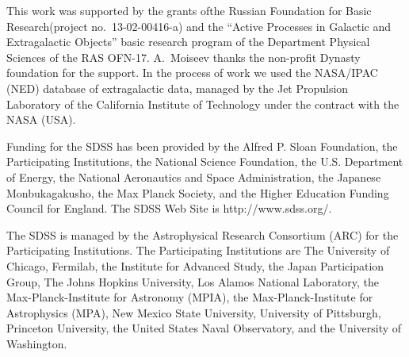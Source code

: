 \documentclass{ab}
\begin{document}
\begin{acknowledgements}
This work was supported by the grants of\linebreak the Russian
Foundation for Basic Research\linebreak (project
\mbox{no.~13-02-00416-a}) and the ``Active Processes in Galactic
and Extragalactic Objects'' basic research program of the
Department Physical Sciences of the RAS OFN-17.  A.~Moiseev thanks
the non-profit Dynasty foundation for the support. In the process
of work we used the NASA/IPAC (NED) database of extragalactic
data, managed by the Jet Propulsion Laboratory of the California
Institute of Technology under the contract with the NASA (USA). 

Funding for the SDSS has been provided by the Alfred P. Sloan
Foundation, the Participating Institutions, the National Science
Foundation, the U.S. Department of Energy, the National
Aeronautics and Space Administration, the Japanese Monbukagakusho,
the Max Planck Society, and the Higher Education Funding Council
for England. The SDSS Web Site is http://www.sdss.org/. 

The SDSS is managed by the Astrophysical Research Consortium (ARC)
for the Participating Institutions. The Participating Institutions
are The University of Chicago, Fermilab, the Institute for
Advanced Study, the Japan Participation Group, The Johns Hopkins
University, Los Alamos National Laboratory, the
Max-Planck-Institute for Astronomy (MPIA), the
Max-Planck-Institute for Astrophysics (MPA), New Mexico State
University, University of Pittsburgh, Princeton University, the
United States Naval Observatory, and the University of Washington. 

\end{acknowledgements}
\end{document}
